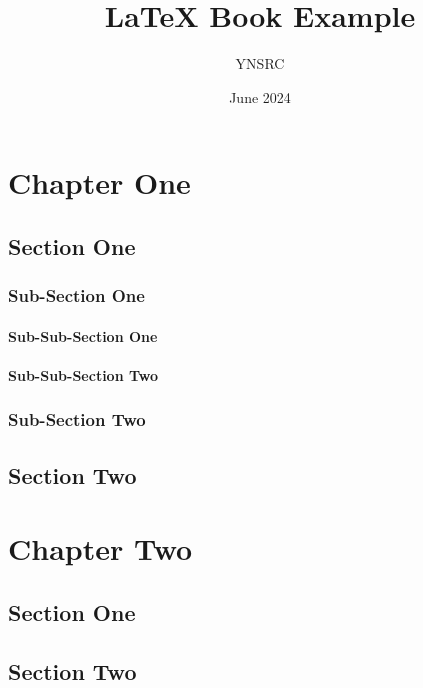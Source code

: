 \documentclass[12pt, twoside]{book}
\title{\LaTeX{} Book Example}
\author{YNSRC}
\date{June 2024}
\begin{document}
\maketitle
\tableofcontents

\chapter{Chapter One}

\section{Section One}
\blindtext[2]

\subsection{Sub-Section One}
\blindtext[3]

\subsubsection{Sub-Sub-Section One}
\blindtext[4]

\subsubsection{Sub-Sub-Section Two}
\blindtext[2]

\subsection{Sub-Section Two}
\blindtext[3]

\section{Section Two}
\blindtext[4]

\chapter{Chapter Two}

\section{Section One}
\blindtext[3]

\section{Section Two}
\blindtext
\end{document}
